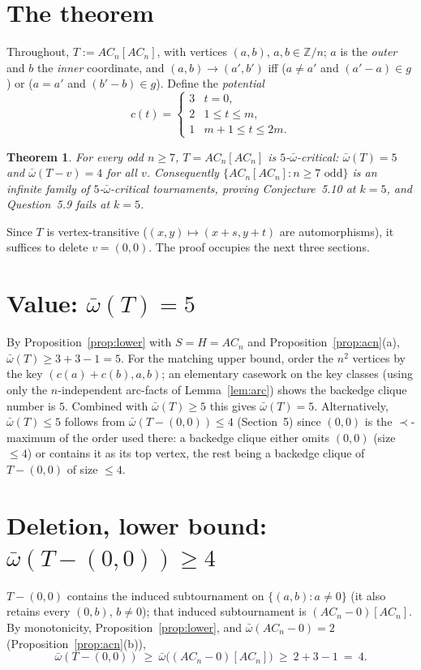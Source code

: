 \documentclass[11pt]{article}
\newcommand{\ob}{\bar\omega}
\newcommand{\Z}{\mathbb{Z}}
\theoremstyle{plain}
\newtheorem{theorem}{Theorem}
\theoremstyle{definition}
\begin{document}
\section{The theorem}

Throughout, $T:=AC_n[AC_n]$, with vertices $(a,b)$, $a,b\in\Z/n$; $a$ is the \emph{outer} and
$b$ the \emph{inner} coordinate, and $(a,b)\to(a',b')$ iff ($a\ne a'$ and $(a'-a)\in g$) or
($a=a'$ and $(b'-b)\in g$). Define the \emph{potential}
\[
c(t)=\begin{cases}3 & t=0,\\ 2 & 1\le t\le m,\\ 1 & m+1\le t\le 2m.\end{cases}
\]

\begin{theorem}\label{thm:main}
For every odd $n\ge 7$, $T=AC_n[AC_n]$ is $5$-$\ob$-critical: $\ob(T)=5$ and $\ob(T-v)=4$ for all
$v$. Consequently $\{AC_n[AC_n]:n\ge 7\text{ odd}\}$ is an infinite family of $5$-$\ob$-critical
tournaments, proving Conjecture~5.10 at $k=5$, and Question~5.9 fails at $k=5$.
\end{theorem}

Since $T$ is vertex-transitive ($(x,y)\mapsto(x+s,y+t)$ are automorphisms), it suffices to delete
$v=(0,0)$. The proof occupies the next three sections.

\section{Value: $\ob(T)=5$}
By Proposition~\ref{prop:lower} with $S=H=AC_n$ and Proposition~\ref{prop:acn}(a),
$\ob(T)\ge 3+3-1=5$. For the matching upper bound, order the $n^2$ vertices by the key
$(c(a)+c(b),a,b)$; an elementary casework on the key classes (using only the $n$-independent
arc-facts of Lemma~\ref{lem:arc}) shows the backedge clique number is $5$. Combined with
$\ob(T)\ge5$ this gives $\ob(T)=5$. Alternatively, $\ob(T)\le5$ follows from
$\ob(T-(0,0))\le 4$ (Section~5) since $(0,0)$ is the $\prec$-maximum of the order used there:
a backedge clique either omits $(0,0)$ (size $\le4$) or contains it as its top vertex, the rest
being a backedge clique of $T-(0,0)$ of size $\le4$.

\section{Deletion, lower bound: $\ob(T-(0,0))\ge 4$}
$T-(0,0)$ contains the induced subtournament on $\{(a,b):a\ne 0\}$ (it also retains every
$(0,b)$, $b\ne0$); that induced subtournament is $(AC_n-0)[AC_n]$. By monotonicity,
Proposition~\ref{prop:lower}, and $\ob(AC_n-0)=2$ (Proposition~\ref{prop:acn}(b)),
\[
\ob(T-(0,0))\ \ge\ \ob\big((AC_n-0)[AC_n]\big)\ \ge\ 2+3-1\ =\ 4 .
\]
\end{document}
